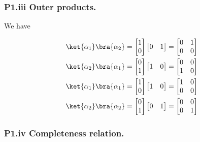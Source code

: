 \subsubsection{P1.iii Outer products.}

We have

\begin{align*}
\ket{\alpha_1}\bra{\alpha_2} &=
\begin{bmatrix}
1 \\
0
\end{bmatrix} 
\begin{bmatrix}
0 & 1
\end{bmatrix} 
=
\begin{bmatrix}
0 & 1 \\
0 & 0
\end{bmatrix} \\
\ket{\alpha_2}\bra{\alpha_1} &=
\begin{bmatrix}
0 \\
1
\end{bmatrix} 
\begin{bmatrix}
1 & 0
\end{bmatrix} 
=
\begin{bmatrix}
0 & 0 \\
1 & 0
\end{bmatrix} \\
\ket{\alpha_1}\bra{\alpha_1} &=
\begin{bmatrix}
1 \\
0
\end{bmatrix} 
\begin{bmatrix}
1 & 0
\end{bmatrix} 
=
\begin{bmatrix}
1 & 0 \\
0 & 0
\end{bmatrix} \\
\ket{\alpha_2}\bra{\alpha_2} &=
\begin{bmatrix}
0 \\
1
\end{bmatrix} 
\begin{bmatrix}
0 & 1
\end{bmatrix} 
=
\begin{bmatrix}
0 & 0 \\
0 & 1
\end{bmatrix} \\
\end{align*}

\subsubsection{P1.iv Completeness relation.}

